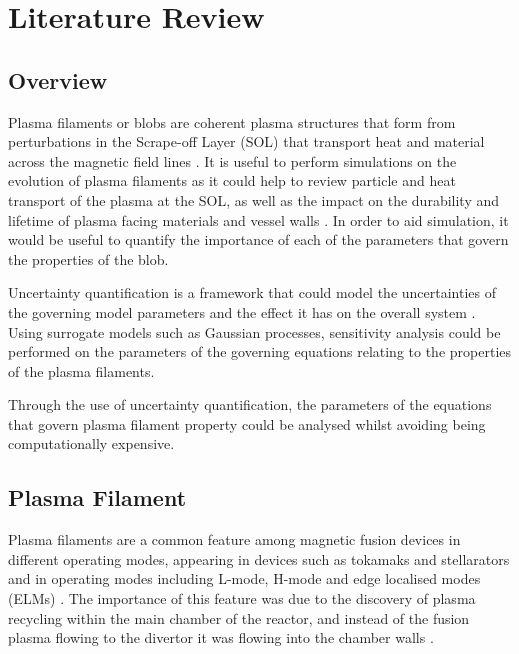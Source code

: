 \documentclass{article}
\begin{document}
\section*{Literature Review}
\subsection*{Overview}
Plasma filaments or blobs are coherent plasma structures that form from perturbations in the Scrape-off Layer (SOL) that transport heat and material across the magnetic field lines \cite{dippolito_convective_2011, hoare_dynamics_2019}. It is useful to perform simulations on the evolution of plasma filaments as it could help to review particle and heat transport of the plasma at the SOL, as well as the impact on the durability and lifetime of plasma facing materials and vessel walls \cite{carralero_experimental_2015, krasheninnikov_recent_2008}. In order to aid simulation, it would be useful to quantify the importance of each of the parameters that govern the properties of the blob.

Uncertainty quantification is a framework that could model the uncertainties of the governing model parameters and the effect it has on the overall system \cite{sudret_surrogate_2017}. Using surrogate models such as Gaussian processes, sensitivity analysis could be performed on the parameters of the governing equations relating to the properties of the plasma filaments.

Through the use of uncertainty quantification, the parameters of the equations that govern plasma filament property could be analysed whilst avoiding being computationally expensive. 

\subsection*{Plasma Filament}
Plasma filaments are a common feature among magnetic fusion devices in different operating modes, appearing in devices such as tokamaks and stellarators and in operating modes including L-mode, H-mode and edge localised modes (ELMs) \cite{ben_ayed_inter-elm_2009, killer_plasma_2020, boedo_transport_2003}. The importance of this feature was due to the discovery of plasma recycling within the main chamber of the reactor, and instead of the fusion plasma flowing to the divertor it was flowing into the chamber walls \cite{krasheninnikov_recent_2008,dippolito_convective_2011}.
\end{document}
